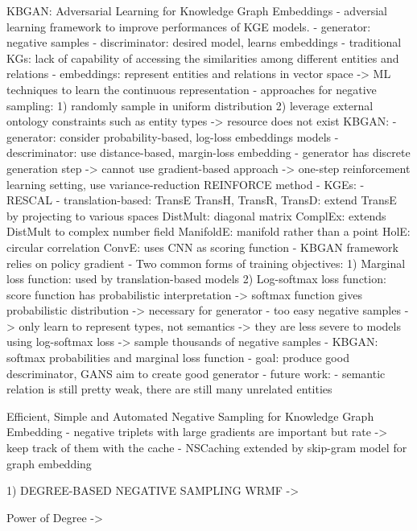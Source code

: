 \cite{cai2017kbgan}
KBGAN: Adversarial Learning for Knowledge Graph Embeddings
- adversial learning framework to improve performances of KGE models.
- generator: negative samples
- discriminator: desired model, learns embeddings
- traditional KGs: lack of capability of accessing the similarities among different entities and relations
- embeddings: represent entities and relations in vector space -> ML techniques to learn the continuous representation
- approaches for negative sampling:
1) randomly sample in uniform distribution
2) leverage external ontology constraints such as entity types
-> resource does not exist
KBGAN:
- generator: consider probability-based, log-loss embeddings models 
- descriminator: use distance-based, margin-loss embedding
- generator has discrete generation step -> cannot use gradient-based approach
-> one-step reinforcement learning setting, use variance-reduction REINFORCE method 
- KGEs: 
    - RESCAL
    - translation-based:
        TransE
        TransH, TransR, TransD: extend TransE by projecting to various spaces
        DistMult: diagonal matrix
        ComplEx: extends DistMult to complex number field
        ManifoldE: manifold rather than a point
        HolE: circular correlation
        ConvE: uses CNN as scoring function
- KBGAN framework relies on policy gradient
- Two common forms of training objectives:
    1) Marginal loss function: used by translation-based models
    2) Log-softmax loss function: score function has probabilistic interpretation
    -> softmax function gives probabilistic distribution -> necessary for generator
- too easy negative samples -> only learn to represent types, not semantics
-> they are less severe to models using log-softmax loss -> sample thousands of negative samples
- KBGAN: softmax probabilities and marginal loss function
- goal: produce good descriminator, GANS aim to create good generator
- future work:
    - semantic relation is still pretty weak, there are still many unrelated entities 

    
\cite{zhang2020efficient}
Efficient, Simple and Automated Negative Sampling for Knowledge Graph Embedding
- negative triplets with large gradients are important but rate 
-> keep track of them with the cache
- NSCaching extended by skip-gram model for graph embedding





1) DEGREE-BASED NEGATIVE SAMPLING
    WRMF
        ->
        
    Power of Degree
        ->
        
